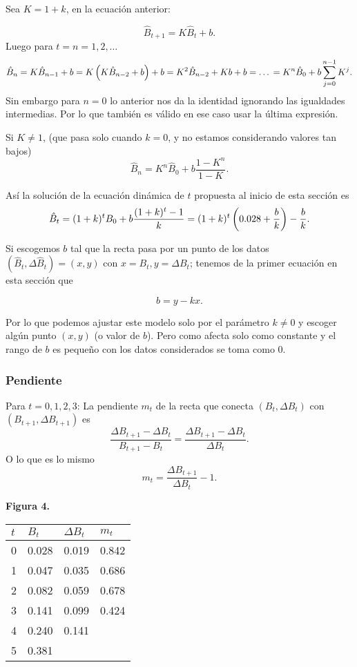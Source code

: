 \documentclass[11pt]{article}
\begin{document}
Sea \(K = 1+k\), en la ecuación anterior:

    \[\hat B_{t+1} = K\hat B_t +b.\] Luego para \(t = n = 1,2,\ldots\) \[
    \hat B_n = K \hat B_{n-1}+b = K \left(K \hat B_{n-2} +b\right)+b = K^2 \hat B_{n-2}+Kb+b = \ldots \\
    = K^n \hat B_0+ b\sum^{n-1}_{j=0}K^j.
\] Sin embargo para \(n=0\) lo anterior nos da la identidad ignorando
las igualdades intermedias. Por lo que también es válido en ese caso
usar la última expresión.

Si \(K\neq 1\), (que pasa solo cuando \(k=0\), y no estamos considerando
valores tan bajos) \[
    \hat B_n = K^n \hat B_0+ b\frac{1-K^n}{1-K}.
\]

Así la solución de la ecuación dinámica de \(t\) propuesta al inicio de
esta sección es \[
    \hat B_t = (1+k)^t B_0 +b \frac{(1+k)^t-1}{k} \\
    = (1+k)^t \left(0.028 +\frac{b}{k}\right)-\frac{b}{k}.
\]

Si escogemos \(b\) tal que la recta pasa por un punto de los datos
\((\hat B_t, \Delta \hat B_t) = (x, y)\) con \(x= B_t, y=\Delta B_t\);
tenemos de la primer ecuación en esta sección que

\[b = y -k x.\]

Por lo que podemos ajustar este modelo solo por el parámetro \(k\neq 0\)
y escoger algún punto \((x,y)\) (o valor de \(b\)). Pero como afecta
solo como constante y el rango de \(b\) es pequeño con los datos
considerados se toma como 0.

    \hypertarget{pendiente}{%
\subsubsection{Pendiente}\label{pendiente}}

Para \(t=0,1,2,3\): La pendiente \(m_t\) de la recta que conecta
\((B_t,\Delta B_t)\) con \((B_{t+1}, \Delta B_{t+1})\) es
\[\frac{\Delta B_{t+1} - \Delta B_t}{B_{t+1} - B_t} = \frac{\Delta B_{t+1}-\Delta B_t}{\Delta B_t}.\]
O lo que es lo mismo \[m_t = \frac{\Delta B_{t+1}}{\Delta B_t}-1.\]

    \textbf{Figura 4.}

\begin{longtable}[]{@{}llll@{}}
\toprule
\(t\) & \(B_t\) & \(\Delta B_t\) & \(m_t\) \\
\midrule
\endhead
0 & 0.028 & 0.019 & 0.842 \\
1 & 0.047 & 0.035 & 0.686 \\
2 & 0.082 & 0.059 & 0.678 \\
3 & 0.141 & 0.099 & 0.424 \\
4 & 0.240 & 0.141 & \\
5 & 0.381 & & \\
\bottomrule
\end{longtable}
\end{document}
